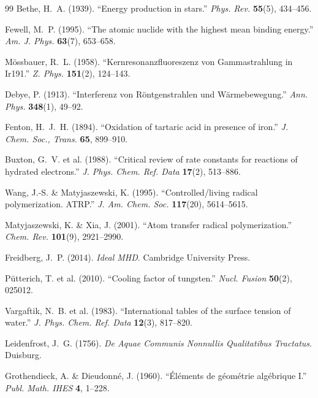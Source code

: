 \begin{thebibliography}{99}
Bethe, H.~A. (1939).
``Energy production in stars.''
\textit{Phys. Rev.} \textbf{55}(5), 434--456.

Fewell, M.~P. (1995).
``The atomic nuclide with the highest mean binding energy.''
\textit{Am. J. Phys.} \textbf{63}(7), 653--658.

M\"ossbauer, R.~L. (1958).
``Kernresonanzfluoreszenz von Gammastrahlung in Ir191.''
\textit{Z. Phys.} \textbf{151}(2), 124--143.

Debye, P. (1913).
``Interferenz von R\"ontgenstrahlen und W\"armebewegung.''
\textit{Ann. Phys.} \textbf{348}(1), 49--92.

Fenton, H.~J.~H. (1894).
``Oxidation of tartaric acid in presence of iron.''
\textit{J. Chem. Soc., Trans.} \textbf{65}, 899--910.

Buxton, G.~V. et al. (1988).
``Critical review of rate constants for reactions of hydrated electrons.''
\textit{J. Phys. Chem. Ref. Data} \textbf{17}(2), 513--886.

Wang, J.-S. \& Matyjaszewski, K. (1995).
``Controlled/living radical polymerization. ATRP.''
\textit{J. Am. Chem. Soc.} \textbf{117}(20), 5614--5615.

Matyjaszewski, K. \& Xia, J. (2001).
``Atom transfer radical polymerization.''
\textit{Chem. Rev.} \textbf{101}(9), 2921--2990.

Freidberg, J.~P. (2014).
\textit{Ideal MHD}. Cambridge University Press.

P\"utterich, T. et al. (2010).
``Cooling factor of tungsten.''
\textit{Nucl. Fusion} \textbf{50}(2), 025012.

Vargaftik, N.~B. et al. (1983).
``International tables of the surface tension of water.''
\textit{J. Phys. Chem. Ref. Data} \textbf{12}(3), 817--820.

Leidenfrost, J.~G. (1756).
\textit{De Aquae Communis Nonnullis Qualitatibus Tractatus}. Duisburg.


Grothendieck, A. \& Dieudonn\'e, J. (1960).
``\'El\'ements de g\'eom\'etrie alg\'ebrique I.''
\textit{Publ. Math. IHES} \textbf{4}, 1--228.


\end{thebibliography}
